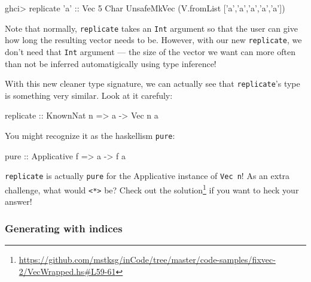 \documentclass[]{article}
\newenvironment{Shaded}{}{}
\newcommand{\DataTypeTok}[1]{\textcolor[rgb]{0.56,0.13,0.00}{#1}}
\newcommand{\DecValTok}[1]{\textcolor[rgb]{0.25,0.63,0.44}{#1}}
\newcommand{\CharTok}[1]{\textcolor[rgb]{0.25,0.44,0.63}{#1}}
\newcommand{\OtherTok}[1]{\textcolor[rgb]{0.00,0.44,0.13}{#1}}
\newcommand{\FunctionTok}[1]{\textcolor[rgb]{0.02,0.16,0.49}{#1}}
\newcommand{\NormalTok}[1]{#1}
\renewcommand{\href}[2]{#2\footnote{\url{#1}}}
\begin{document}
\begin{Shaded}
\begin{Highlighting}[]
\NormalTok{ghci}\FunctionTok{>}\NormalTok{ replicate }\CharTok{'a'}\OtherTok{ ::} \DataTypeTok{Vec} \DecValTok{5} \DataTypeTok{Char}
\DataTypeTok{UnsafeMkVec}\NormalTok{ (V.fromList [}\CharTok{'a'}\NormalTok{,}\CharTok{'a'}\NormalTok{,}\CharTok{'a'}\NormalTok{,}\CharTok{'a'}\NormalTok{,}\CharTok{'a'}\NormalTok{])}
\end{Highlighting}
\end{Shaded}

Note that normally, \texttt{replicate} takes an \texttt{Int} argument so that
the user can give how long the resulting vector needs to be. However, with our
new \texttt{replicate}, we don't need that \texttt{Int} argument --- the size of
the vector we want can more often than not be inferred automatigically using
type inference!

With this new cleaner type signature, we can actually see that
\texttt{replicate}'s type is something very similar. Look at it carefuly:

\begin{Shaded}
\begin{Highlighting}[]
\NormalTok{replicate}\OtherTok{ ::} \DataTypeTok{KnownNat}\NormalTok{ n }\OtherTok{=>}\NormalTok{ a }\OtherTok{->} \DataTypeTok{Vec}\NormalTok{ n a}
\end{Highlighting}
\end{Shaded}

You might recognize it as the haskellism \texttt{pure}:

\begin{Shaded}
\begin{Highlighting}[]
\NormalTok{pure}\OtherTok{ ::} \DataTypeTok{Applicative}\NormalTok{ f }\OtherTok{=>}\NormalTok{ a }\OtherTok{->}\NormalTok{ f a}
\end{Highlighting}
\end{Shaded}

\texttt{replicate} is actually \texttt{pure} for the Applicative instance of
\texttt{Vec\ n}! As an extra challenge, what would
\texttt{\textless{}*\textgreater{}} be? Check out
\href{https://github.com/mstksg/inCode/tree/master/code-samples/fixvec-2/VecWrapped.hs\#L59-61}{the
solution} if you want to heck your answer!

\subsubsection{Generating with indices}\label{generating-with-indices}
\end{document}
